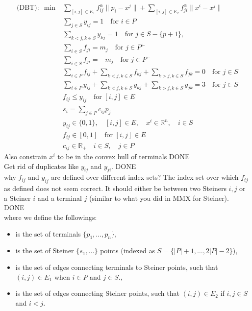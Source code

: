 \documentclass[11pt,reqno,a4paper]{amsart}
\newenvironment{itemizeb}
{\begin{itemize}
     \itemsep=2pt}{
\end{itemize}}
\numberwithin{equation}{section}
\theoremstyle{mytheorem}
\theoremstyle{myremark}
\theoremstyle{myparagraph}
\newcommand{\R}{\mathbb{R}}
\begin{document}
    \begin{align}
        \text{(DBT)}: \; \min &\sum_{[i,j] \in E_1} f_{ij}^{\alpha}\|p_i - x^j\| + \sum_{[i,j] \in E_2} f_{ji}^{\alpha}\|x^i - x^j\| \\
        & \sum_{j \in S} y_{ij} = 1 \quad \text{for } i \in P \\
        & \sum_{k < j, k \in S} y_{kj} = 1 \quad \text{for } j \in S - \{p+1\}, \label{dbt_form:connectedness} \\
        & \sum_{i \in S} f_{ji} = m_j \quad \text{for } j \in P^+ \label{dbt_form:sum_sinks} \\
        & \sum_{i \in S} f_{ji} = -m_j \quad \text{for } j \in P^- \label{dbt_form:sum_sources} \\
        & \sum_{i \in P} f_{ij} + \sum_{k < j, k \in S} f_{kj} + \sum_{k > j, k \in S} f_{jk} = 0 \quad \text{for } j \in S \label{dbt_form:sum_steiner_0}  \\
        & \sum_{i \in P} y_{ij} + \sum_{k < j, k \in S} y_{kj} + \sum_{k > j, k \in S} y_{jk} = 3 \quad \text{for } j \in S \label{dbt_form:degree_bound} \\
        & f_{ij} \le y_{ij} \quad \text{for } [i,j] \in E \\
        & s_i = \sum_{j \in P} c_{ij} p_j \\
        & y_{ij} \in \{0, 1\}, \quad [i, j] \in E, \quad x^i \in \mathbb{R}^n, \quad i \in S \\
        & f_{ij} \in [0,1] \quad \text{for } [i,j] \in E\\
        & c_{ij} \in \R_+ \quad i \in S, \quad j \in P
    \end{align}
    {\color{red} Also constrain $x^i$ to be in the convex hull of terminals DONE} \\
    {\color{red} Get rid of duplicates like $y_{ij}$ and $y_{ji}$. DONE} \\
    {\color{red} why $f_{ij}$ and $y_{ij}$ are defined over different index sets? The index set over which $f_{ij}$ as defined does not seem correct. It should either be between two Steiners $i,j$ or a Steiner $i$  and a terminal $j$ (similar to what you did in MMX for Steiner). DONE} \\
    where we define the followings:

    \begin{itemizeb}
         cm=.3 cm
        \item [$P$] is the set of terminals $\{p_1, \ldots, p_n\}$,
        \item [$S$] is the set of Steiner $\{s_1, \ldots\}$ points (indexed as $S = \{|P| + 1, \dots, 2|P|-2\}$),
        \item [$E_1$] is the set of edges connecting terminals to Steiner points, such that $(i,j) \in E_1$ when $i \in P$ and $j \in S$.,
        \item [$E_2$] is the set of edges connecting Steiner points, such that $(i,j) \in E_2$ if $i,j \in S$ and $i < j$.
    \end{itemizeb}
\end{document}
